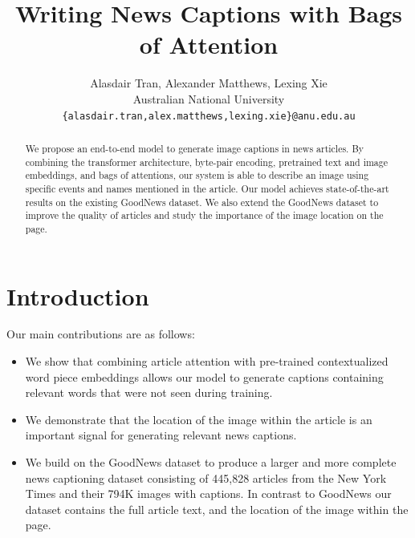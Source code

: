 \documentclass[10pt,twocolumn,letterpaper]{article}
\begin{document}
\title{Writing News Captions with Bags of Attention}

\author{Alasdair Tran, Alexander Matthews, Lexing Xie\\
Australian National University\\
{\tt\small \{alasdair.tran,alex.matthews,lexing.xie\}@anu.edu.au}
}

\maketitle

\begin{abstract}
   We propose an end-to-end model to generate image captions in news articles.
   By combining the transformer architecture, byte-pair encoding, pretrained
   text and image embeddings, and bags of attentions, our system is able to
   describe an image using specific events and names mentioned in the article.
   Our model achieves state-of-the-art results on the existing GoodNews
   dataset. We also extend the GoodNews dataset to improve the quality of
   articles and study the importance of the image location on the page.
\end{abstract}

\section{Introduction}

Our main contributions are as follows:

\begin{itemize}
   \item We show that combining article attention with pre-trained
   contextualized word piece embeddings allows our model to generate captions
   containing relevant words that were not seen during training.

   \item We demonstrate that the location of the image within the article is an
   important signal for generating relevant news captions.

   \item We build on the GoodNews dataset to produce a larger and more
   complete news captioning dataset consisting of 445,828 articles from the New
   York Times and their 794K images with captions. In contrast to GoodNews
   our dataset contains the full article text, and the location of the image
   within the page.
\end{itemize}
\end{document}

